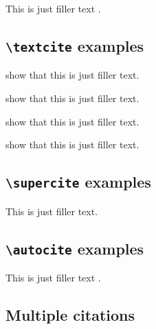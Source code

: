 \documentclass[a4paper]{article}
\newcommand{\cmd}[1]{\texttt{\textbackslash #1}}
\begin{document}
This is just filler text \parencite[see][59--63]{companion}.

\subsection*{\cmd{textcite} examples}


\textcite{companion} show that this is just filler text.

\textcite[59]{companion} show that this is just filler text.

\textcite[see][]{companion} show that this is just filler text.

\textcite[see][59--63]{companion} show that this is just filler text.

\subsection*{\cmd{supercite} examples}

This is just filler text.\supercite{companion}

\subsection*{\cmd{autocite} examples}


This is just filler text \autocite{companion}.

\subsection*{Multiple citations}


\cite{companion,augustine,bertram,cotton,hammond,massa,murray}



\clearpage
\printbibliography
\end{document}
